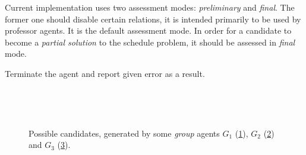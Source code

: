 \documentclass[../../ThesisDoc]{subfiles}
\begin{document}
Current implementation uses two assessment modes:
\emph{preliminary} and \emph{final}. The former one should disable certain
relations, it is intended primarily to be used by professor agents. It is the
default assessment mode.
In order for a candidate to become a \emph{partial solution} to the schedule
problem, it should be assessed in \emph{final} mode.

\noindent
Terminate the agent and report given error as a result.




\begin{figure}[b]
  \begin{subfigure}{0.3\textwidth}
    \drawFirstAlone{2cm} %
    \caption{}
    \label{fig:candidate-1}
  \end{subfigure}
  ~
  \begin{subfigure}{0.3\textwidth}
    \drawSecondAlone[trim left, xshift=1.7cm]{2cm} %
    \caption{}
    \label{fig:candidate-2}
  \end{subfigure}
  ~
  \begin{subfigure}{0.3\textwidth}
    \drawThirdAlone{2cm} %
    \caption{}
    \label{fig:candidate-3}
  \end{subfigure}

  \caption{Possible candidates, generated by some \emph{group} agents
            $G_1$ (\ref{fig:candidate-1}), $G_2$ (\ref{fig:candidate-2}) and
            $G_3$ (\ref{fig:candidate-3}).}
  \label{fig:candidates-alone}
\end{figure}
\end{document}

